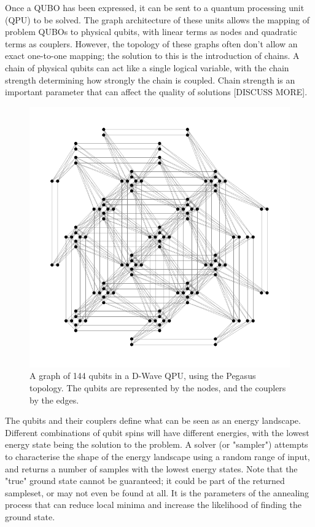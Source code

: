\documentclass[aps,pra,10pt,twocolumn]{revtex4-2}
\begin{document}
Once a QUBO has been expressed, it can be sent to a quantum processing unit (QPU) to be solved. The graph architecture of these units allows the mapping of problem QUBOs to physical qubits, with linear terms as nodes and quadratic terms as couplers. However, the topology of these graphs often don't allow an exact one-to-one mapping; the solution to this is the introduction of chains. A chain of physical qubits can act like a single logical variable, with the chain strength determining how strongly the chain is coupled. Chain strength is an important parameter that can affect the quality of solutions [DISCUSS MORE].

\begin{figure}[h]
    \centering
    \includegraphics[width=\linewidth]{../Figures/pegasus.pdf}
    \caption{A graph of 144 qubits in a D-Wave QPU, using the Pegasus topology. The qubits are represented by the nodes, and the couplers by the edges.}
    \label{fig:pegasus}
\end{figure}

The qubits and their couplers define what can be seen as an energy landscape. Different combinations of qubit spins will have different energies, with the lowest energy state being the solution to the problem. A solver (or "sampler") attempts to characterise the shape of the energy landscape using a random range of input, and returns a number of samples with the lowest energy states. Note that the "true" ground state cannot be guaranteed; it could be part of the returned sampleset, or may not even be found at all. It is the parameters of the annealing process that can reduce local minima and increase the likelihood of finding the ground state.
\end{document}
